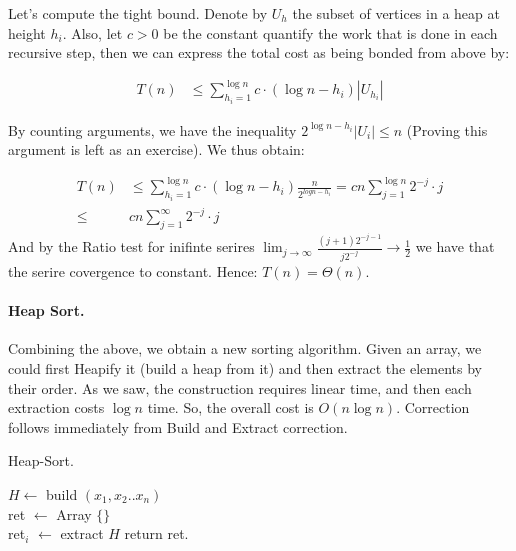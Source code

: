 Let's compute the tight bound. Denote by $U_h$ the subset of vertices in a heap at height $h_{i}$. Also, let $c > 0 $ be the constant quantify the work that is done in each recursive step, then we can express the total cost as being bonded from above by: 

\begin{equation*}
  \begin{split}
    T\left( n \right) & \le \sum_{ h_{i} =1}^{ \log n }{c \cdot \left( \log n -  h_{i} \right)  |U_{h_{i}}|   } 
  \end{split}
\end{equation*}

By counting arguments, we have the inequality $ 2^{\log n - h_{i}}|U_{i}| \le n $ (Proving this argument is left as an exercise). We thus obtain:  

\begin{equation*}
  \begin{split}
    T\left( n \right)  & \le  \sum_{ h_{i} =1}^{ \log n }{c \cdot \left( \log n -  h_{i} \right) \frac{n}{2^{log n - h_{i}} }} = c n \sum_{ j = 1}^{ \log n }{ 2^{-j} \cdot j  }  \\ 
      \le &  c n \sum_{ j = 1}^{ \infty }{ 2^{-j} \cdot j  } 
  \end{split}
\end{equation*}
And by the Ratio test for inifinte serires $ \lim_{j\rightarrow \infty} \frac{(j+1)2^{-j-1}}{j2^{-j}} \rightarrow \frac{1}{2}$ we have that the serire covergence to constant. Hence: $ T\left( n \right) = \Theta\left( n \right) $. 


\paragraph{Heap Sort.}   
Combining the above, we obtain a new sorting algorithm. Given an array, we could first Heapify it (build a heap from it) and then extract the elements by their order. As we saw, the construction requires linear time, and then each extraction costs $\log n$ time. So, the overall cost is $O\left( n\log n  \right)$. Correction follows immediately from Build and Extract correction.  
\begin{algbox}{Heap-Sort.}
\begin{algorithm}[H]
  $H \leftarrow $ build $ \left( x_1, x_2 .. x_{n}  \right) $ \\ 
  ret $ \leftarrow $ Array $ \{ \} $ \\
   {
  ret$_{i}$ $\leftarrow$ extract $H$
  }
  return ret. 
\end{algorithm}
\end{algbox}

